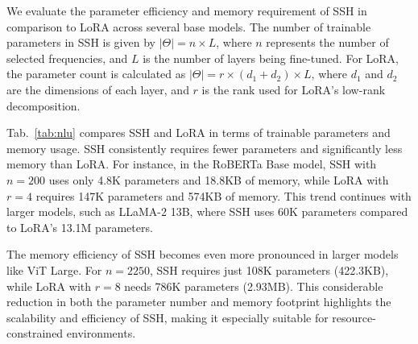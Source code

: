 We evaluate the parameter efficiency and memory requirement of SSH in comparison to LoRA across several base models. The number of trainable parameters in SSH is given by \( |\Theta| = n \times L \), where \( n \) represents the number of selected frequencies, and \( L \) is the number of layers being fine-tuned. 
For LoRA, the parameter count is calculated as \( |\Theta| = r \times (d_1 + d_2) \times L \), where \( d_1 \) and \( d_2 \) are the dimensions of each layer, and \( r \) is the rank used for LoRA's low-rank decomposition.


Tab.~\ref{tab:nlu} compares SSH and LoRA in terms of trainable parameters and memory usage. SSH consistently requires fewer parameters and significantly less memory than LoRA. For instance, in the RoBERTa Base model, SSH with \( n = 200 \) uses only 4.8K parameters and 18.8KB of memory, while LoRA with \( r = 4 \) requires 147K parameters and 574KB of memory. This trend continues with larger models, such as LLaMA-2 13B, where SSH uses 60K parameters compared to LoRA's 13.1M parameters.


The memory efficiency of SSH becomes even more pronounced in larger models like ViT Large. For \( n = 2250 \), SSH requires just 108K parameters (422.3KB), while LoRA with \( r = 8 \) needs 786K parameters (2.93MB). This considerable reduction in both the parameter number and memory footprint highlights the scalability and efficiency of SSH, making it especially suitable for resource-constrained environments.

